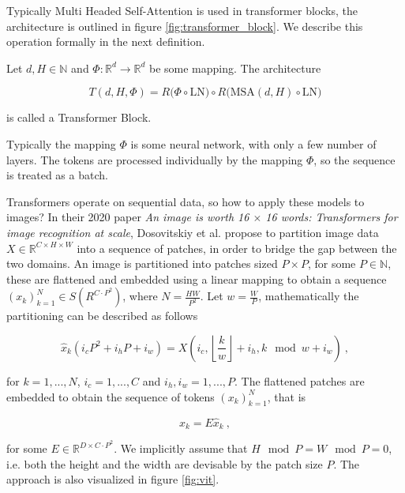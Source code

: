 Typically Multi Headed Self-Attention is used in transformer blocks,
the architecture is outlined in figure \ref{fig:transformer_block}.
We describe this operation formally in the next definition.

\begin{definition} 
    \label{def:transformer_block}
    Let $d, H \in \mathbb N$ and $\Phi: \mathbb{R}^d \to \mathbb{R}^d$ be some mapping.
    The architecture 

        \begin{equation*}
            T(d, H, \Phi) = R \big( \Phi \circ \text{LN} \big) \circ R \big( \text{MSA}(d, H) \circ \text{LN} \big)
        \end{equation*}

    is called a Transformer Block.
\end{definition}

Typically the mapping $\Phi$ is some neural network, with only a few number of layers.
The tokens are processed individually by the mapping $\Phi$, so the sequence is treated as a batch.

\vspace{2mm}

Transformers operate on sequential data, 
so how to apply these models to images?
In their 2020 paper \textit{An image is worth 16 $\times$ 16 words: Transformers for image recognition at scale},
Dosovitskiy et al. \cite{dosovitskiyImageWorth16x162021} propose to partition image data $X \in \mathbb R^{C \times H \times W}$
into a sequence of patches, in order to bridge the gap between the two domains.
An image is partitioned into patches sized $P \times P$, for some $P \in \mathbb N$, 
these are flattened and embedded using a linear mapping to obtain a sequence $(x_k)_{k=1}^N \in S (R^{C \cdot P^2})$,
where $N = \frac{HW}{P^2}$. 
Let $w = \frac{W}{P}$, mathematically the partitioning can be described as follows 

    \begin{equation} \label{eq:vit_patch}
        \hat{x}_{k}( i_c P^2 + i_h P + i_w) = X \left( i_c, \left\lfloor \frac{k}{w} \right\rfloor + i_h, k \mod w + i_w \right) ~,
    \end{equation}

for $k = 1, ..., N$, $i_c = 1, ..., C$ and $i_h, i_w = 1, ..., P$.
The flattened patches are embedded to obtain the sequence of tokens $(x_k)_{k=1}^N$,
that is

    $$ x_k = E \hat{x}_k ~, $$

for some $E \in \mathbb R^{D \times C \cdot P^2}$.
We implicitly assume that $H \mod P = W \mod P = 0$, i.e. both the height and the width are devisable by the patch size $P$.
The approach is also visualized in figure \ref{fig:vit}.

